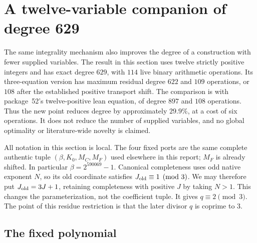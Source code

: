 \section{A twelve-variable companion of degree 629}
\label{sec:twelve}

The same integrality mechanism also improves the degree of a construction
with fewer supplied variables. The result in this section uses twelve strictly
positive integers and has exact degree $629$, with $114$ live binary arithmetic
operations. Its three-equation version has maximum residual degree $622$ and
$109$ operations, or $108$ after the established positive transport shift.
The comparison is with package~52's twelve-positive lean equation, of degree
$897$ and $108$ operations. Thus the new point reduces degree by approximately
$29.9\%$, at a cost of six operations. It does not reduce the number of supplied
variables, and no global optimality or literature-wide novelty is claimed.

All notation in this section is local. The four fixed ports are the same
complete authentic tuple $(\beta,K_0,M_C,M_F)$ used elsewhere in this report;
$M_F$ is already shifted. In particular $\beta=2^{590069}-1$. Canonical
completeness uses odd native exponent $N$, so its old coordinate satisfies
$J_{\rm old}\equiv1\pmod3$. We may therefore put $J_{\rm old}=3J+1$,
retaining completeness with positive $J$ by taking $N>1$. This changes the
parameterization, not the coefficient tuple. It gives $q\equiv2\pmod3$.
The point of this residue restriction is that the later divisor $q$ is
coprime to $3$.

\subsection{The fixed polynomial}


